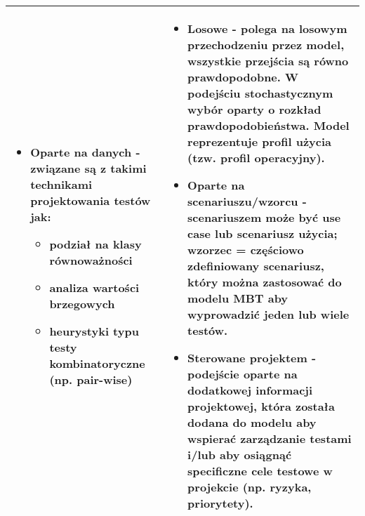 \documentclass[../main.tex]{subfiles}
\begin{document}
\begin{table}[H]
\begin{center}
\begin{tabular}{| p{8cm} | p{8cm} |}
\begin{itemize}
                    \item \textbf{Oparte na danych} - związane są z takimi technikami projektowania testów jak:
                    \begin{itemize}
                        \item podział na \textbf{klasy równoważności}
                        \item analiza \textbf{wartości} brzegowych
                        \item heurystyki typu testy kombinatoryczne (np. pair-wise)
                    \end{itemize}
                \end{itemize}
                &
                \begin{itemize}
                    \item \textbf{Losowe} - polega na \textbf{losowym przechodzeniu przez model}, wszystkie przejścia są równo
                    prawdopodobne. \textbf{W podejściu stochastycznym} wybór oparty o \textbf{rozkład prawdopodobieństwa}. Model reprezentuje profil
                    użycia (tzw. \textbf{profil operacyjny}).
                    \item \textbf{Oparte na scenariuszu/wzorcu} - scenariuszem może być use case lub
                    scenariusz użycia; wzorzec = częściowo zdefiniowany scenariusz, który można
                    zastosować do modelu MBT aby wyprowadzić jeden lub wiele testów.
                    \item \textbf{Sterowane projektem} - podejście oparte na dodatkowej informacji projektowej, która została
                    dodana do modelu aby wspierać zarządzanie testami i/lub aby osiągnąć specificzne cele testowe w projekcie (np. ryzyka, priorytety).
                \end{itemize}\\
                \hline
            \end{tabular}
        \end{center}
    \end{table}
\end{document}
